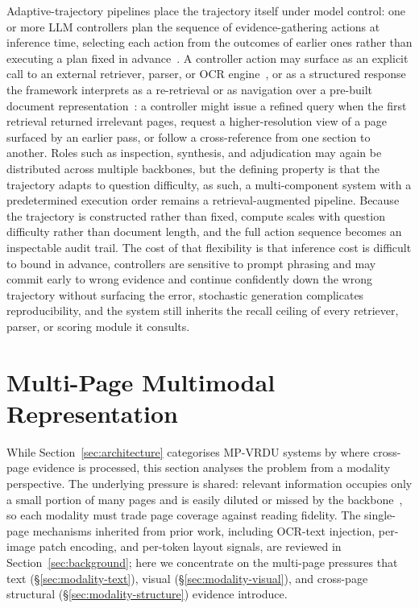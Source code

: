 \documentclass[11pt]{article}
\begin{document}
Adaptive-trajectory pipelines place the trajectory itself under model control: one or more LLM controllers plan the sequence of evidence-gathering actions at inference time, selecting each action from the outcomes of earlier ones rather than executing a plan fixed in advance~\cite{zheng2026docv,sun2025docagent}. A controller action may surface as an explicit call to an external retriever, parser, or OCR engine~\cite{wang2025vidorag,yu2025mact}, or as a structured response the framework interprets as a re-retrieval or as navigation over a pre-built document representation~\cite{jain2025simpledoc,fu2026dmap}: a controller might issue a refined query when the first retrieval returned irrelevant pages, request a higher-resolution view of a page surfaced by an earlier pass, or follow a cross-reference from one section to another. Roles such as inspection, synthesis, and adjudication may again be distributed across multiple backbones, but the defining property is that the trajectory adapts to question difficulty, as such, a multi-component system with a predetermined execution order remains a retrieval-augmented pipeline. Because the trajectory is constructed rather than fixed, compute scales with question difficulty rather than document length, and the full action sequence becomes an inspectable audit trail. The cost of that flexibility is that inference cost is difficult to bound in advance, controllers are sensitive to prompt phrasing and may commit early to wrong evidence and continue confidently down the wrong trajectory without surfacing the error, stochastic generation complicates reproducibility, and the system still inherits the recall ceiling of every retriever, parser, or scoring module it consults.

\section{Multi-Page Multimodal Representation}
\label{sec:modality}

While Section~\ref{sec:architecture} categorises MP-VRDU systems by where cross-page evidence is processed, this section analyses the problem from a modality perspective. The underlying pressure is shared: relevant information occupies only a small portion of many pages and is easily diluted or missed by the backbone~\cite{liu2024lost}, so each modality must trade page coverage against reading fidelity. The single-page mechanisms inherited from prior work, including OCR-text injection, per-image patch encoding, and per-token layout signals, are reviewed in Section~\ref{sec:background}; here we concentrate on the multi-page pressures that text (\S\ref{sec:modality-text}), visual (\S\ref{sec:modality-visual}), and cross-page structural (\S\ref{sec:modality-structure}) evidence introduce.
\end{document}

